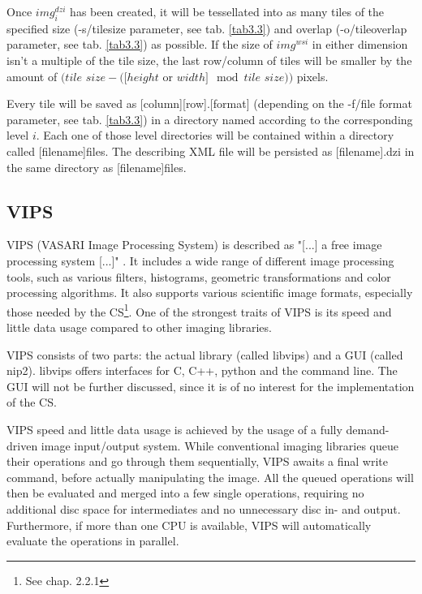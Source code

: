 Once $img^{dzi}_i$ has been created, it will be tessellated into as many tiles of the specified size (-s/tile{\textunderscore}size parameter, see tab. \ref{tab3.3}) and overlap (-o/tile{\textunderscore}overlap parameter, see tab. \ref{tab3.3}) as possible. If the size of $img^{wsi}$ in either dimension isn't a multiple of the tile size, the last row/column of tiles will be smaller by the amount of $(tile$ $size - ([height$ or $width] \mod tile$ $size))$ pixels.

Every tile will be saved as [column]{\textunderscore}[row].[format] (depending on the -f/file{\textunderscore} format parameter, see tab. \ref{tab3.3}) in a directory named according to the corresponding level $i$. Each one of those level directories will be contained within a directory called [filename]{\textunderscore}files. The describing XML file will be persisted as [filename].dzi in the same directory as [filename]{\textunderscore}files.


\subsection{VIPS}

VIPS (VASARI Image Processing System) is described as "[...] a free image processing system [...]" \cite{web:vips}. It includes a wide range of different image processing tools, such as various filters, histograms, geometric transformations and color processing algorithms. It also supports various scientific image formats, especially those needed by the CS\footnote{See chap. 2.2.1}\cite{web:vips}. One of the strongest traits of VIPS is its speed and little data usage compared to other imaging libraries\cite{cupitt05}.

VIPS consists of two parts: the actual library (called libvips) and a GUI (called nip2). libvips offers interfaces for C, C++, python and the command line. The GUI will not be further discussed, since it is of no interest for the implementation of the CS. 

VIPS speed and little data usage is achieved by the usage of a fully demand-driven image input/output system. While conventional imaging libraries queue their operations and go through them sequentially, VIPS awaits a final write command, before actually manipulating the image. All the queued operations will then be evaluated and merged into a few single operations, requiring no additional disc space for intermediates and no unnecessary disc in- and output. Furthermore, if more than one CPU is available, VIPS will automatically evaluate the operations in parallel\cite{cupitt96}.

